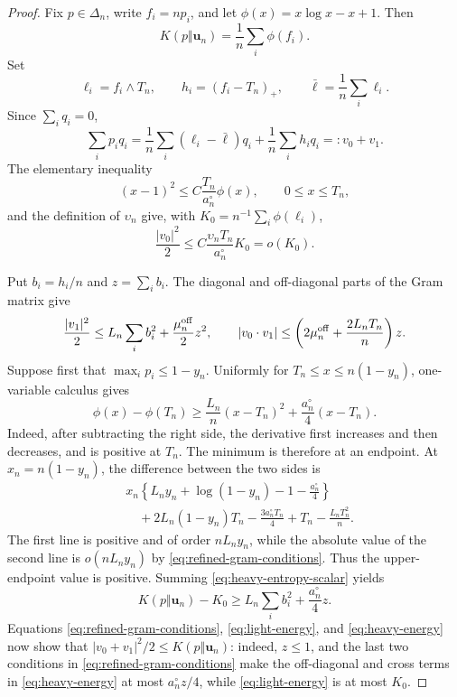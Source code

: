 \begin{proof}
Fix \(p\in\Delta_n\), write \(f_i=np_i\), and let
\(\phi(x)=x\log x-x+1\).  Then
\[
 K(p\Vert \mathbf u_n)=\frac1n\sum_i\phi(f_i).
\]
Set
\[
 \ell_i=f_i\wedge T_n,\qquad h_i=(f_i-T_n)_+,\qquad
 \bar\ell=\frac1n\sum_i\ell_i.
\]
Since \(\sum_iq_i=0\),
\[
 \sum_i p_iq_i
 =
 \frac1n\sum_i(\ell_i-\bar\ell)q_i
 +\frac1n\sum_i h_iq_i
 =:v_0+v_1.
\]
The elementary inequality
\[
 (x-1)^2\le C\frac{T_n}{a_n^\circ}\phi(x),
 \qquad 0\le x\le T_n,
\]
and the definition of \(\upsilon_n\) give, with
\(K_0=n^{-1}\sum_i\phi(\ell_i)\),
\begin{equation}
\label{eq:light-energy}
 \frac{|v_0|^2}{2}
 \le C\frac{\upsilon_nT_n}{a_n^\circ}K_0=o(K_0).
\end{equation}

Put \(b_i=h_i/n\) and \(z=\sum_i b_i\).  The diagonal and off-diagonal
parts of the Gram matrix give
\begin{equation}
\label{eq:heavy-energy}
 \frac{|v_1|^2}{2}
 \le L_n\sum_i b_i^2+\frac{\mu_n^{\rm off}}{2}z^2,
 \qquad
 |v_0\cdot v_1|
 \le\left(2\mu_n^{\rm off}+\frac{2L_nT_n}{n}\right)z.
\end{equation}
Suppose first that \(\max_i p_i\le1-y_n\).  Uniformly for
\(T_n\le x\le n(1-y_n)\), one-variable calculus gives
\begin{equation}
\label{eq:heavy-entropy-scalar}
 \phi(x)-\phi(T_n)
 \ge\frac{L_n}{n}(x-T_n)^2
 +\frac{a_n^\circ}{4}(x-T_n).
\end{equation}
Indeed, after subtracting the right side, the derivative first increases
and then decreases, and is positive at \(T_n\).  The minimum is therefore
at an endpoint. At \(x_n=n(1-y_n)\), the difference between the two sides is
\begin{align*}
 &x_n\left\{L_ny_n+\log(1-y_n)-1-\frac{a_n^\circ}{4}\right\}\\
 &\quad+2L_n(1-y_n)T_n-\frac{3a_n^\circ T_n}{4}
       +T_n-\frac{L_nT_n^2}{n}.
\end{align*}
The first line is positive and of order \(nL_ny_n\), while the absolute
value of the second line is \(o(nL_ny_n)\) by
\eqref{eq:refined-gram-conditions}. Thus the upper-endpoint value is
positive. Summing
\eqref{eq:heavy-entropy-scalar} yields
\[
 K(p\Vert \mathbf u_n)-K_0
 \ge L_n\sum_i b_i^2+\frac{a_n^\circ}{4}z.
\]
Equations \eqref{eq:refined-gram-conditions},
\eqref{eq:light-energy}, and \eqref{eq:heavy-energy} now show that
\(|v_0+v_1|^2/2\le K(p\Vert \mathbf u_n)\): indeed, \(z\le1\), and the last two
conditions in \eqref{eq:refined-gram-conditions} make the off-diagonal and
cross terms in \eqref{eq:heavy-energy} at most
\(a_n^\circ z/4\), while \eqref{eq:light-energy} is at most \(K_0\).


\end{proof}
